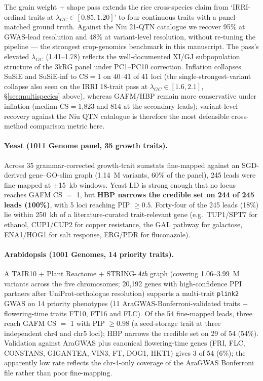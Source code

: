 The grain weight + shape pass extends the rice cross-species
claim from `IRRI-ordinal traits at $\lambda_{GC} \in [0.85, 1.20]$'
to four continuous traits with a panel-matched ground truth.
Against the Niu 21-QTN catalogue we recover 95\% at GWAS-lead
resolution and 48\% at variant-level resolution, without
re-tuning the pipeline --- the strongest crop-genomics benchmark
in this manuscript. The pass's elevated
$\lambda_{GC}$ (1.41--1.78) reflects the well-documented XI/GJ
subpopulation structure of the 3kRG panel under PC1--PC10
correction. Inflation collapses SuSiE and SuSiE-inf to CS$=$1 on
40--41 of 41 loci (the single-strongest-variant collapse also
seen on the IRRI 18-trait pass at $\lambda_{GC} \in [1.6, 2.1]$,
\S\ref{sec:multispecies} above), whereas GAFM/HBP remain more
conservative under inflation (median CS$=$1{,}823 and 814 at the
secondary leads); variant-level recovery against the Niu QTN
catalogue is therefore the most defensible cross-method
comparison metric here.

\paragraph{Yeast (1011 Genome panel, 35 growth traits).}
Across 35 grammar-corrected growth-trait sumstats\cite{peter2018genome,
bloom2015genetic} fine-mapped against an SGD-derived
gene--GO-slim graph (1.14~M variants, 60\% of the panel), 245 leads
were fine-mapped at $\pm$15~kb windows. Yeast LD is strong enough that
no locus reaches GAFM CS $=$ 1, but \textbf{HBP narrows the credible
set on 244 of 245 leads (100\%)}, with 5 loci reaching PIP $\geq 0.5$.
Forty-four of the 245 leads (18\%) lie within 250~kb of a
literature-curated trait-relevant gene (e.g.\ TUP1/SPT7 for ethanol,
CUP1/CUP2 for copper resistance, the GAL pathway for galactose,
ENA1/HOG1 for salt response, ERG/PDR for fluconazole).

\paragraph{Arabidopsis (1001 Genomes, 14 priority traits).}
A TAIR10 + Plant Reactome + STRING-\emph{Ath} graph (covering
1.06--3.99~M variants across the five chromosomes; 20{,}192 genes
with high-confidence PPI partners after UniProt-orthologue
resolution) supports a multi-trait \texttt{plink2} GWAS on 14
priority phenotypes (11 AraGWAS-Bonferroni-validated traits +
flowering-time traits FT10, FT16 and FLC). Of the 54 fine-mapped
leads, three reach GAFM CS $=$ 1 with PIP $\geq 0.98$ (a seed-storage
trait at three independent chr4 and chr5 loci); HBP narrows the
credible set on 29 of 54 (54\%). Validation against AraGWAS plus
canonical flowering-time genes (FRI, FLC, CONSTANS, GIGANTEA, VIN3,
FT, DOG1, HKT1) gives 3 of 54 (6\%); the apparently low rate
reflects the chr-4-only coverage of the AraGWAS Bonferroni file
rather than poor fine-mapping.

